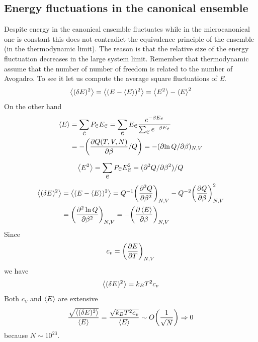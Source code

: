 \documentclass[../main/main.tex]{subfiles}
\begin{document}
\subsection{Energy fluctuations in the canonical ensemble}
Despite energy in the canonical ensemble fluctuates while in the microcanonical one is constant this does not contradict the equivalence principle of the ensemble (in the thermodynamic limit). The reason is that the relative size of the energy fluctuation decreases in the large system limit. Remember that thermodynamic assume that the number of number of freedom is related to the number of Avogadro.
To see it let us compute the average square fluctuations of \emph{E}.
\begin{equation}
\expval{(\delta E)^2} = \expval{(E- \expval{E} )^2} = \expval{E^2} - \expval{E}^2
\end{equation}
On the other hand
\begin{equation}
\begin{split}
  \expval{E} &= \sum_{\mathcal{C}}^{} P_{\mathcal{C}} E_{\mathcal{C}} = \sum_{\mathcal{C}}^{} E_{\mathcal{C}} \frac{e^{-\beta E_{\mathcal{C}}} }{\sum_{\mathcal{C}}^{} e^{-\beta E_{\mathcal{C}}}  } \\
  & = - \qty( \pdv{Q (T,V,N)}{\beta }/Q ) = - (\partial{\ln{Q} }/\partial{\beta }  )_{N,V}
\end{split}
\end{equation}
\begin{equation}
  \expval{E^2} = \sum_{\mathcal{C}}^{} P_{\mathcal{C}} E_{\mathcal{C}}^2 = (\partial^2 Q/ \partial{\beta ^2} ) / Q
\end{equation}
\begin{equation}
\begin{split}
  \expval{(\delta E)^2} &= \expval{(E- \expval{E} )^2}  = Q^{-1} \qty(\pdv[2]{Q}{\beta } )_{N,V} - Q^{-2} \qty(\pdv{Q}{\beta } )^2_{N,V}\\
  & =  \qty( \pdv[2]{\ln{Q} }{\beta} )_{N,V} = - \qty(\pdv{\expval{E} }{\beta } )_{N,V}
\end{split}
\end{equation}
Since
\begin{equation}
  c_v = \qty(\pdv{E}{T} )_{N,V}
\end{equation}
we have
\begin{equation}
  \expval{(\delta E)^2} = k_B T^2 c_v
\end{equation}
Both \( c_V \) and \( \expval{E}  \) are extensive
\begin{equation}
  \frac{\sqrt{\expval{(\delta E)^2} } }{\expval{E} } = \frac{\sqrt{k_B T^2 c_v} }{\expval{E} } \sim O \qty(\frac{1}{\sqrt{N} }) \Rightarrow 0
\end{equation}
because \( N \sim 10^{23} \).
\end{document}
